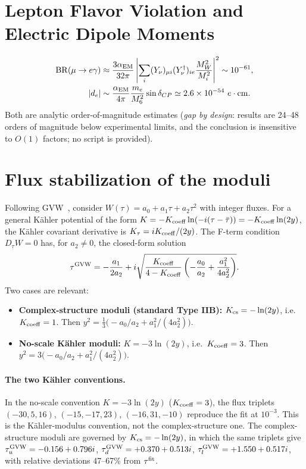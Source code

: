 \documentclass[12pt,a4paper]{article}
\numberwithin{equation}{section}
\begin{document}
\section{Lepton Flavor Violation and Electric Dipole Moments}
\begin{align}
\mathrm{BR}(\mu\to e\gamma) &\approx \frac{3\alpha_{\rm EM}}{32\pi}\left|\sum_i (Y_\nu)_{\mu i}(Y_\nu^\dagger)_{ie}\frac{M_W^2}{M_i^2}\right|^2 \sim 10^{-61}, \\
|d_e| &\sim \frac{\alpha_{\rm EM}}{4\pi}\frac{m_e}{M_6^2}\sin\delta_{CP} \simeq 2.6\times10^{-54}~e\cdot{\rm cm}.
\end{align}
Both are analytic order-of-magnitude estimates (\emph{gap by design}:
results are 24--48 orders of magnitude below experimental limits, and
the conclusion is insensitive to \(O(1)\) factors; no script is
provided).

\section{Flux stabilization of the moduli}
\label{sec:flux}

Following GVW~\cite{GVW2000}, consider
\(W(\tau) = a_0 + a_1\tau + a_2\tau^2\) with integer fluxes.
For a general K\"ahler potential of the form
\(K = -K_{\rm coeff}\ln(-i(\tau-\bar\tau)) = -K_{\rm coeff}\ln(2y)\),
the K\"ahler covariant derivative is
\(K_\tau = iK_{\rm coeff}/(2y)\). The F-term condition \(D_\tau W = 0\)
has, for \(a_2 \neq 0\), the closed-form solution
\begin{equation}
\tau^{\rm GVW} = -\frac{a_1}{2a_2}
+ i\sqrt{\frac{K_{\rm coeff}}{4-K_{\rm coeff}}\left(-\frac{a_0}{a_2} + \frac{a_1^2}{4a_2^2}\right)}.
\label{eq:tau_gvw_general}
\end{equation}
Two cases are relevant:
\begin{itemize}
\item \textbf{Complex-structure moduli (standard Type IIB):}
\(K_{\rm cs} = -\ln(2y)\), i.e.\ \(K_{\rm coeff}=1\). Then
\(y^2 = \frac{1}{3}\bigl(-a_0/a_2 + a_1^2/(4a_2^2)\bigr)\).
\item \textbf{No-scale K\"ahler moduli:}
\(K = -3\ln(2y)\), i.e.\ \(K_{\rm coeff}=3\). Then
\(y^2 = 3\bigl(-a_0/a_2 + a_1^2/(4a_2^2)\bigr)\).
\end{itemize}

\paragraph{The two K\"ahler conventions.}
In the no-scale convention \(K = -3\ln(2y)\) (\(K_{\rm coeff}=3\)),
the flux triplets \((-30,5,16)\), \((-15,-17,23)\), \((-16,31,-10)\)
reproduce the fit at \(10^{-3}\). This is the K\"ahler-modulus
convention, not the complex-structure one. The complex-structure
moduli are governed by \(K_{\rm cs} = -\ln(2y)\), in which the same
triplets give \(\tau_u^{\rm GVW} = -0.156+0.796i\),
\(\tau_d^{\rm GVW} = +0.370+0.513i\),
\(\tau_l^{\rm GVW} = +1.550+0.517i\), with relative deviations
47--67\% from \(\tau^{\rm fit}\).
\end{document}
